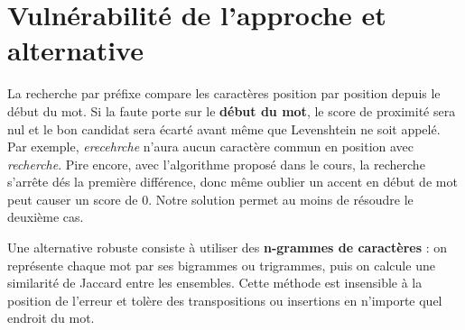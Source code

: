 \section{Vulnérabilité de l'approche et alternative}

La recherche par préfixe compare les caractères position par position depuis le début du mot. Si la faute porte sur le \textbf{début du mot}, le score de proximité sera nul et le bon candidat sera écarté avant même que Levenshtein ne soit appelé. Par exemple, \textit{erecehrche} n'aura aucun caractère commun en position avec \textit{recherche}. Pire encore, avec l'algorithme proposé dans le cours, la recherche s'arrête dés la première différence, donc même oublier un accent en début de mot peut causer un score de 0. Notre solution permet au moins de résoudre le deuxième cas.

Une alternative robuste consiste à utiliser des \textbf{n-grammes de caractères} : on représente chaque mot par ses bigrammes ou trigrammes, puis on calcule une similarité de Jaccard entre les ensembles. Cette méthode est insensible à la position de l'erreur et tolère des transpositions ou insertions en n'importe quel endroit du mot.

